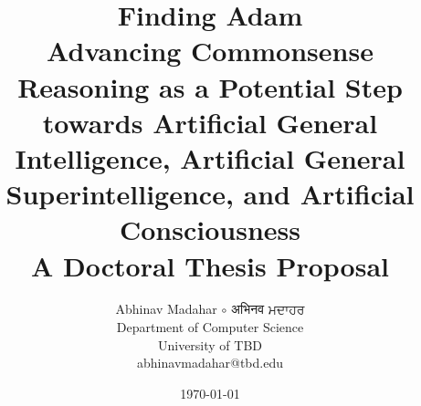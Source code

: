 \title{
    {\huge \textbf{Finding Adam}} \\
    Advancing Commonsense Reasoning as a Potential Step towards Artificial General Intelligence, Artificial General Superintelligence, and Artificial Consciousness
    \vspace{1cm} \\
    A Doctoral Thesis Proposal}

\author{
    Abhinav Madahar $\circ$ {\devanagari अभिनव } {\gurmukhi ਮਦਾਹਰ} \\
    Department of Computer Science \\
    University of TBD \\
    {\small abhinavmadahar@tbd.edu}}

\date{\today}

\maketitle{}
